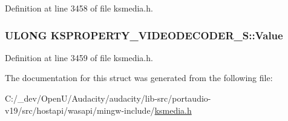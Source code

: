 Definition at line 3458 of file ksmedia.\+h.

\subsubsection[{\texorpdfstring{Value}{Value}}]{\setlength{\rightskip}{0pt plus 5cm}U\+L\+O\+NG K\+S\+P\+R\+O\+P\+E\+R\+T\+Y\+\_\+\+V\+I\+D\+E\+O\+D\+E\+C\+O\+D\+E\+R\+\_\+\+S\+::\+Value}\hypertarget{struct_k_s_p_r_o_p_e_r_t_y___v_i_d_e_o_d_e_c_o_d_e_r___s_a6f63ea6174e4621d47b0da499fd9324f}{}\label{struct_k_s_p_r_o_p_e_r_t_y___v_i_d_e_o_d_e_c_o_d_e_r___s_a6f63ea6174e4621d47b0da499fd9324f}


Definition at line 3459 of file ksmedia.\+h.



The documentation for this struct was generated from the following file\+:\begin{DoxyCompactItemize}
\item 
C\+:/\+\_\+dev/\+Open\+U/\+Audacity/audacity/lib-\/src/portaudio-\/v19/src/hostapi/wasapi/mingw-\/include/\hyperlink{ksmedia_8h}{ksmedia.\+h}\end{DoxyCompactItemize}
